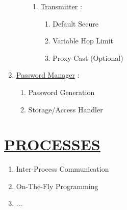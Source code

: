 \documentclass[11pt]{article}
\begin{document}
\begin{enumerate}
\begin{enumerate}
\begin{enumerate}
			\item[] \ul{Transmitter}  :
			\begin{enumerate}
				\item[] Default Secure
				\item[] Variable Hop Limit
				\item[] Proxy-Cast (Optional)
			\end{enumerate}
		\end{enumerate}
	\end{enumerate}
	
	\item[] \ul{Password Manager} :
	\begin{enumerate}
		\item[] Password Generation
		\item[] Storage/Access Handler
	\end{enumerate}
	
\end{enumerate}


\section*{\ul{PROCESSES}}
\begin{enumerate}
	\item[] Inter-Process Communication
	\item[] On-The-Fly Programming
	\item[] ...
\end{enumerate}
\end{document}
